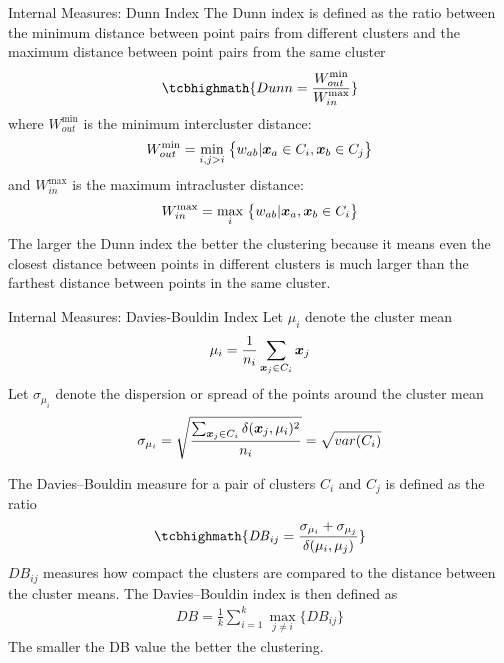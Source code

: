 \begin{frame}{Internal Measures: Dunn Index}
The Dunn index is def\/{i}ned as the ratio between the
minimum distance between point pairs from different clusters and
the maximum distance between point pairs from the same cluster
\begin{align*}
\tcbhighmath{
  Dunn = \frac{\displaystyle W_{out}^{\min}}{\displaystyle W_{in}^{\max}}
}
\end{align*}
where $W_{out}^{\min}$ is the minimum intercluster distance:
\begin{align*}
  \displaystyle
  W_{out}^{\min} = \min_{i, j>i} \; \bigl\{
  w_{ab} | {\boldsymbol x}_a \in C_i, {\boldsymbol x}_b \in C_{j}\bigr\}
\end{align*}
and $W_{in}^{\max}$ is the maximum intracluster distance:
\begin{align*}
  \displaystyle
  W_{in}^{\max} = \max_{i} \; \bigl\{ w_{ab} | {\boldsymbol x}_a,{\boldsymbol x}_b \in C_i   \bigr\}
\end{align*}
The larger the Dunn index the better the clustering because it means even
the closest distance between points in different clusters is much larger
than the farthest distance between points in the same cluster.
\end{frame}



\begin{frame}{Internal Measures: Davies-Bouldin Index}
Let $\mu_i$ denote the cluster mean
\begin{align*}
\mu_i = \frac{1}{n_i} \sum_{{\boldsymbol x}_{j} \in C_i} {\boldsymbol x}_{j}
\end{align*}
Let
$\sigma_{\mu_i}$ denote the dispersion or spread of the points around the cluster
mean
\begin{align*}
\sigma_{\mu_i} = \sqrt{\frac{\sum_{{\boldsymbol x}_{j} \in C_i} \delta({\boldsymbol x}_{j},
\mu_i)^2}{n_i}} = \sqrt{var(C_i)}
\end{align*}

The Davies--Bouldin measure for a pair of clusters $C_i$ and $C_{j}$ is
def\/{i}ned as the ratio
\begin{align*}
\tcbhighmath{
\mathit{DB}_{ij} = \frac{\sigma_{\mu_i}+\sigma_{\mu_{j}}}{\dist(\mu_i,\mu_{j})}
}
\end{align*}
$\mathit{DB}_{ij}$ measures how compact the clusters are compared to the distance
between the cluster means.
The Davies--Bouldin index is then def\/{i}ned as
\begin{align*}
  \mathit{DB} = \frac{1}{k} \sum_{i=1}^k \max_{j\ne i} \{\mathit{DB}_{ij} \}
\end{align*}
The smaller the DB value the better the clustering.
\end{frame}


